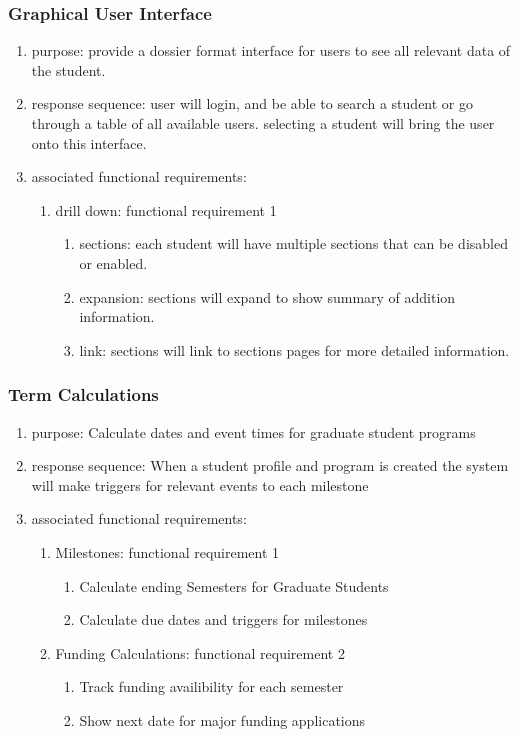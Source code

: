 \documentclass{journal}
\begin{document}
\subsubsection{Graphical User Interface}
\begin{enumerate}
\item purpose: provide a dossier format interface for users to see all relevant data of the student.
\item response sequence: user will login, and be able to search a student or go through a table of all available users. selecting a student will bring the user onto this interface.
\item associated functional requirements:
\begin{enumerate}
\item drill down: functional requirement 1
\begin{enumerate}
\item sections: each student will have multiple sections that can be disabled or enabled.
\item expansion: sections will expand to show summary of addition information.
\item link: sections will link to sections pages for more detailed information.
\end{enumerate}
\end{enumerate}
\end{enumerate}
\subsubsection{Term Calculations}
\begin{enumerate}
\item purpose: Calculate dates and event times for graduate student programs 
\item response sequence: When a student profile and program is created the system will make triggers for relevant events to each milestone
\item associated functional requirements:
\begin{enumerate}
\item Milestones: functional requirement 1
\begin{enumerate}
\item Calculate ending Semesters for Graduate Students
\item Calculate due dates and triggers for milestones
\end{enumerate}
\item Funding Calculations: functional requirement 2
\begin{enumerate}
\item Track funding availibility for each semester
\item Show next date for major funding applications
\end{enumerate}
\end{enumerate}
\end{enumerate}
\end{document}
